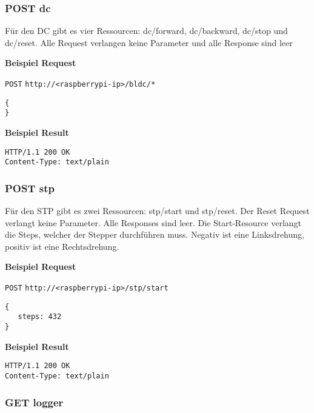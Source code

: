 \subsubsection{POST dc}

Für den DC gibt es vier Ressourcen: dc/forward, dc/backward, dc/stop und dc/reset. Alle Request verlangen keine Parameter und alle Response sind leer

\textbf{Beispiel Request}

\texttt{POST}
\texttt{http://<raspberrypi-ip>/bldc/*} \\
\begin{lstlisting}[caption=POST dc/* Request, tabsize=2]
{
}
\end{lstlisting}

\textbf{Beispiel Result}
\begin{lstlisting}[caption=POST dc/* Response, tabsize=2]
HTTP/1.1 200 OK
Content-Type: text/plain
\end{lstlisting}




\subsubsection{POST stp}

Für den STP gibt es zwei Ressourcen: stp/start und stp/reset. Der Reset Request verlangt keine Parameter. Alle Responses sind leer. Die Start-Resource verlangt die Steps, welcher der Stepper durchführen muss. Negativ ist eine Linksdrehung, positiv ist eine Rechtsdrehung.

\textbf{Beispiel Request}

\texttt{POST}
\texttt{http://<raspberrypi-ip>/stp/start} \\
\begin{lstlisting}[caption=POST stp/start Request, tabsize=2]
{
   steps: 432
}
\end{lstlisting}

\textbf{Beispiel Result}
\begin{lstlisting}[caption=POST stp/start Response, tabsize=2]
HTTP/1.1 200 OK
Content-Type: text/plain
\end{lstlisting}







\subsubsection{GET logger}

